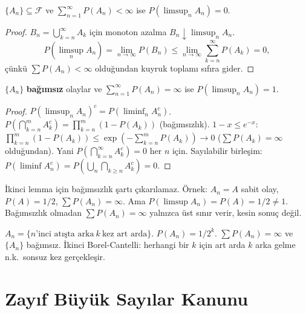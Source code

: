 \begin{teorem}
\label{thm:bc1}
$\{A_n\} \subseteq \mathcal{F}$ ve $\sum_{n=1}^\infty P(A_n) < \infty$ ise
$P(\limsup_n A_n) = 0$.
\end{teorem}

\begin{proof}
$B_n = \bigcup_{k=n}^\infty A_k$ için monoton azalma $B_n \downarrow \limsup_n A_n$.
\[
  P(\limsup_n A_n) = \lim_{n\to\infty} P(B_n) \leq \lim_{n\to\infty} \sum_{k=n}^\infty P(A_k) = 0,
\]
çünkü $\sum P(A_n) < \infty$ olduğundan kuyruk toplamı sıfıra gider.
\end{proof}

\begin{teorem}
\label{thm:bc2}
$\{A_n\}$ \textbf{bağımsız} olaylar ve $\sum_{n=1}^\infty P(A_n) = \infty$ ise
$P(\limsup_n A_n) = 1$.
\end{teorem}

\begin{proof}
$P(\limsup_n A_n)^c = P(\liminf_n A_n^c)$.
$P\!\left(\bigcap_{k=n}^m A_k^c\right) = \prod_{k=n}^m (1-P(A_k))$ (bağımsızlık).
$1 - x \leq e^{-x}$: $\prod_{k=n}^m (1-P(A_k)) \leq \exp\!\left(-\sum_{k=n}^m P(A_k)\right) \to 0$
($\sum P(A_k) = \infty$ olduğundan). Yani $P(\bigcap_{k=n}^\infty A_k^c) = 0$ her $n$ için.
Sayılabilir birleşim: $P(\liminf A_n^c) = P(\bigcup_n \bigcap_{k\geq n} A_k^c) = 0$.
\end{proof}

\begin{hataanalizi}
İkinci lemma için bağımsızlık şartı çıkarılamaz.
Örnek: $A_n = A$ sabit olay, $P(A) = 1/2$, $\sum P(A_n) = \infty$.
Ama $P(\limsup A_n) = P(A) = 1/2 \neq 1$.
Bağımsızlık olmadan $\sum P(A_n) = \infty$ yalnızca üst sınır verir, kesin sonuç değil.
\end{hataanalizi}

\begin{ornek}
$A_n = \{n\text{'inci atışta arka}\ k\ \text{kez art arda}\}$.
$P(A_n) = 1/2^k$. $\sum P(A_n) = \infty$ ve $\{A_n\}$ bağımsız.
İkinci Borel-Cantelli: herhangi bir $k$ için art arda $k$ arka gelme n.k.\ sonsuz kez gerçekleşir.
\end{ornek}

\section{Zayıf Büyük Sayılar Kanunu}
\label{sec:zbsk}

